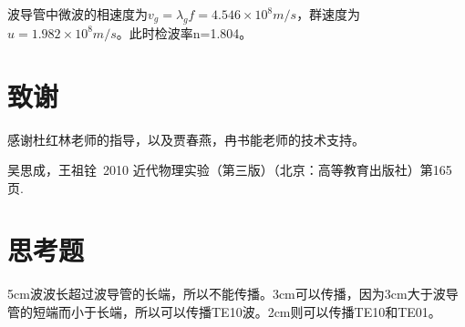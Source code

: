 \documentclass[aps,pre,12pt,preprint,onecolumn,showpacs,showkeys,UTF8]{revtex4-1}
\begin{document}
波导管中微波的相速度为$v_g=\lambda_g f = 4.546\times 10^8m/s$，群速度为$u = 1.982 \times 10^8 m/s$。此时检波率n=1.804。

\section{致谢} 
感谢杜红林老师的指导，以及贾春燕，冉书能老师的技术支持。

\begin{thebibliography}{}
	 吴思成，王祖铨~2010 近代物理实验（第三版）（北京：高等教育出版社）第165页.%
%
\end{thebibliography}

\clearpage
\appendix
\section{思考题} 

5cm波波长超过波导管的长端，所以不能传播。3cm可以传播，因为3cm大于波导管的短端而小于长端，所以可以传播TE10波。2cm则可以传播TE10和TE01。
\end{document}
